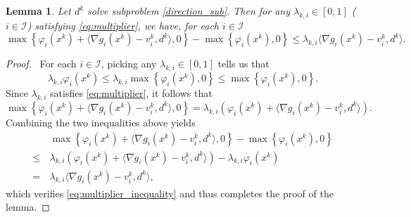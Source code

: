 \documentclass[11pt,a4paper]{article}
\newtheorem{lemma}[theorem]{Lemma}
\theoremstyle{plain}
\begin{document}
\begin{lemma}\label{lemma:multiplier_inequality}
Let $d^k$ solve subproblem \eqref{direction_sub}. Then for any {$\lambda_{k,i} \in \left[0, 1\right]$ ($i\in\mathcal{I}$)} satisfying \eqref{eq:multiplier}, we have, for each {$i \in \mathcal{I}$}
\begin{equation}\label{eq:multiplier_inequality}
\max\left\{\varphi_i(x^k) + \langle \nabla g_i(x^k) - v_i^k, d^k \rangle, 0\right\} - \max\left\{\varphi_i(x^k), 0\right\} \le  \lambda_{k,i} \langle \nabla g_i(x^k) - v_i^k, d^k \rangle.
\end{equation}
\end{lemma}
\begin{proof}\, {For each $i \in \mathcal{I}$,} picking any {$\lambda_{k,i} \in \left[0, 1\right]$} tells us that
\begin{equation*}
\lambda_{k,i} \varphi_i(x^k) \le \lambda_{k,i} \max\left\{\varphi_i(x^k), 0\right\} \le \max\left\{\varphi_i(x^k), 0\right\}.
\end{equation*}
Since {$\lambda_{k,i}$} satisfies  \eqref{eq:multiplier}, it follows that
\begin{equation*}
\max\left\{\varphi_i(x^k) + \langle \nabla g_i(x^k) - v_i^k, d^k \rangle, 0\right\} = \lambda_{k,i} \left(\varphi_i(x^k) + \langle \nabla g_i(x^k) - v_i^k, d^k \rangle\right).
\end{equation*}
Combining the two inequalities above yields
\begin{equation*}
\begin{aligned}
&\max\left\{\varphi_i(x^k) + \langle \nabla g_i(x^k) - v_i^k, d^k \rangle, 0\right\} 
- \max\left\{\varphi_i(x^k), 0\right\} \\
\le \, & \lambda_{k,i} \left(
\varphi_i(x^k) + \langle \nabla g_i(x^k) - v_i^k, d^k \rangle
\right) - \lambda_{k,i} \varphi_i(x^k) \\
= \, &\lambda_{k,i} \langle \nabla g_i(x^k) - v_i^k, d^k \rangle,
\end{aligned}
\end{equation*}  
which verifies \eqref{eq:multiplier_inequality} and thus completes the proof of the lemma.
\end{proof}\vspace*{0.05in}
\end{document}
